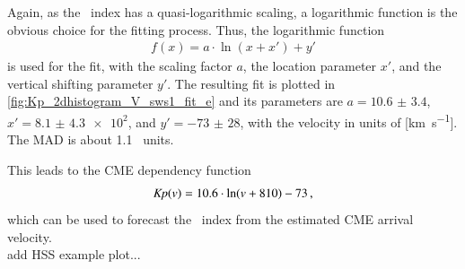 Again, as the \Kp~index has a quasi-logarithmic scaling, a logarithmic function is the obvious choice for the fitting process. Thus, the logarithmic function
\begin{align}
	f(x) = a \cdot \ln\left(x + x'\right) + y'	\label{eq:log_offset_fit_function}
\end{align}
is used for the fit, with the scaling factor $a$, the location parameter $x'$, and the vertical shifting parameter $y'$. The resulting fit is plotted in \autoref{fig:Kp_2dhistogram_V_sws1_fit_e} and its parameters are $a = \num{10.6(34)}$, $x' = \num{8.1(43)e2}$, and $y' = \num{-73(28)}$, with the velocity in units of [\si{\km\per\s}]. The MAD is about 1.1~\Kp{} units.
\begin{figure}
\end{figure}
This leads to the CME dependency function
\begin{align}
	\textit{Kp}(v) = 10.6 \cdot \ln(v + 810) - 73	\,,	\label{eq:kpvsv_CME_dependency_function}
\end{align}
which can be used to forecast the \Kp{}~index from the estimated CME arrival velocity.\\

add HSS example plot...\\

